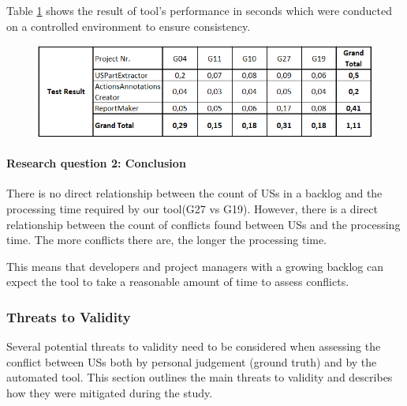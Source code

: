 Table \ref{tb:conflict_performance_result} shows the result of tool's performance in seconds which were conducted on a controlled environment to ensure consistency.
	\begin{figure}[h]
	\begingroup
	\scriptsize
	\centering
	\includegraphics[scale=0.75]{Table/conflict_performance_result.png}
	\label{tb:conflict_performance_result}
	\endgroup
\end{figure}
\paragraph{Research question 2: Conclusion}There is no direct relationship between the count of USs in a backlog and the processing time required by our tool(G27 vs G19).
However, there is a direct relationship between the count of conflicts found between USs and the processing time. The more conflicts there are, the longer the processing time. 

This means that developers and project managers with a growing backlog can expect the tool to take a reasonable amount of time to assess conflicts.
\subsubsection*{Threats to Validity}
Several potential threats to validity need to be considered when assessing the conflict between USs both by personal judgement (ground truth) and by the automated tool. This section outlines the main threats to validity and describes how they were mitigated during the study.
